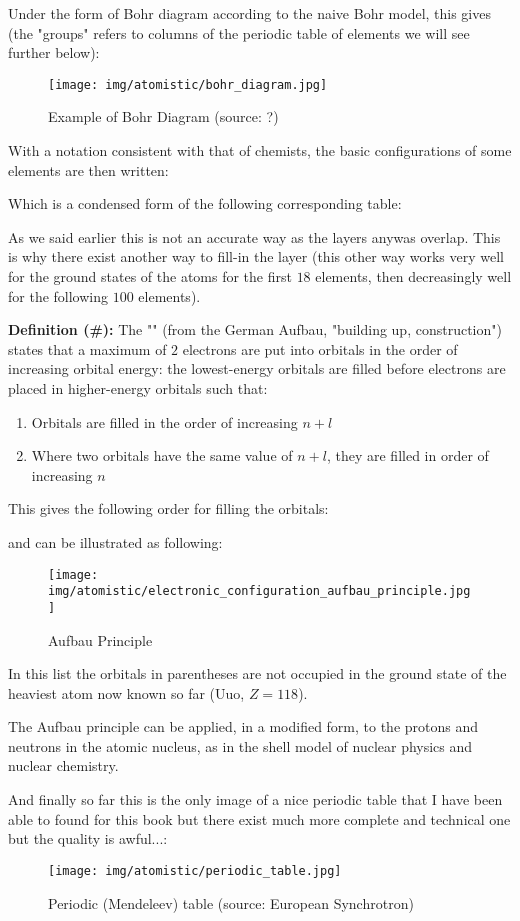 	Under the form of Bohr diagram according to the naive Bohr model, this gives (the "groups" refers to columns of the periodic table of elements we will see further below):
	\begin{figure}[H]
		\centering
		\texttt{[image: img/atomistic/bohr\_diagram.jpg]}
		\caption{Example of Bohr Diagram (source: ?)}
	\end{figure}
	With a notation consistent with that of chemists, the basic configurations of some elements are then written:
	
	Which is a condensed form of the following corresponding table:
	
	As we said earlier this is not an accurate way as the layers anywas overlap. This is why there exist another way to fill-in the layer (this other way works very well for the ground states of the atoms for the first $18$ elements, then decreasingly well for the following $100$ elements).

	\pagebreak
	\textbf{Definition (\#\mydef):} The "" (from the German Aufbau, "building up, construction") states that a maximum of $2$ electrons are put into orbitals in the order of increasing orbital energy: the lowest-energy orbitals are filled before electrons are placed in higher-energy orbitals such that:
	\begin{enumerate}
		\item Orbitals are filled in the order of increasing $n+l$

		\item Where two orbitals have the same value of $n+l$, they are filled in order of increasing $n$
	\end{enumerate}
	This gives the following order for filling the orbitals:
	
	and can be illustrated as following:
	\begin{figure}[H]
		\centering
		\texttt{[image: img/atomistic/electronic\_configuration\_aufbau\_principle.jpg]}
		\caption{Aufbau Principle}
	\end{figure}
	In this list the orbitals in parentheses are not occupied in the ground state of the heaviest atom now known so far (Uuo, $Z = 118$).
	
	The Aufbau principle can be applied, in a modified form, to the protons and neutrons in the atomic nucleus, as in the shell model of nuclear physics and nuclear chemistry.
	
	And finally so far this is the only image of a nice periodic table that I have been able to found for this book but there exist much more complete and technical one but the quality is awful...:
	\begin{figure}[H]
		\centering
		\texttt{[image: img/atomistic/periodic\_table.jpg]}
		\caption{Periodic (Mendeleev) table (source: European Synchrotron)}
	\end{figure}
	
